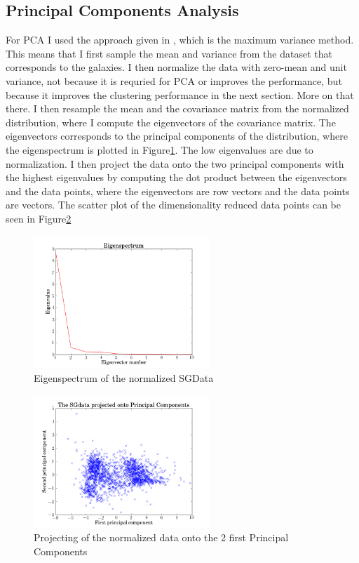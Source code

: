 \documentclass{article}
\theoremstyle{plain}
\theoremstyle{nonumberplain}
\begin{document}



\subsection{Principal Components Analysis}

For PCA I used the approach given in \cite[pp. 561-563]{bishop}, which is the maximum variance method. 
This means that I first sample the mean and variance from the dataset that corresponds to the galaxies. 
I then normalize the data with zero-mean and unit variance, not because it is requried for PCA or improves the performance, but because it improves the clustering performance in the next section.
More on that there.
I then resample the mean and the covariance matrix from the normalized distribution, where I compute the eigenvectors of the covariance matrix.
The eigenvectors corresponds to the principal components of the distribution, where the eigenspectrum is plotted in Figure\ref{fig:eigen}.
The low eigenvalues are due to normalization.
I then project the data onto the two principal components with the highest eigenvalues by computing the dot product between the eigenvectors and the data points, where the eigenvectors are row vectors and the data points are vectors.
The scatter plot of the dimensionality reduced data points can be seen in Figure\ref{fig:projecting}

\begin{figure}[htb]
\centering
\includegraphics[height=5cm]{Images/eigenspectrum.png}
\caption{Eigenspectrum of the normalized SGData}
\label{fig:eigen}
\end{figure}


\begin{figure}[hbt]
\centering
\includegraphics[height=5cm]{Images/PCA_scatter.png}
\caption{Projecting of the normalized data onto the 2 first Principal Components}
\label{fig:projecting}
\end{figure}
\end{document}

